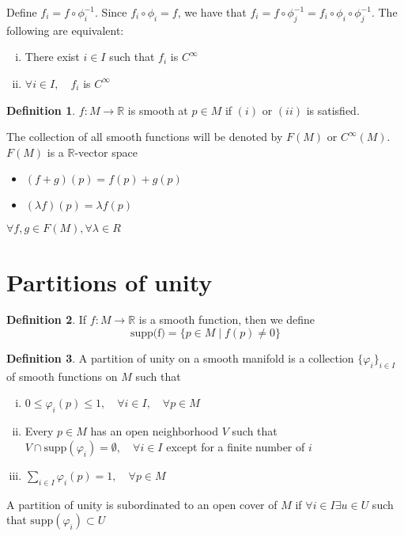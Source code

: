 \documentclass[]{book}
\theoremstyle{definition}
\newtheorem{defin}{Definition}[section]
\theoremstyle{definition}
\theoremstyle{definition}
\theoremstyle{definition}
\theoremstyle{definition}
\theoremstyle{definition}
\theoremstyle{definition}
\theoremstyle{definition}
\theoremstyle{definition}
\theoremstyle{definition}
\theoremstyle{definition}
\newcommand{\R}{\mathbb{R}}
\begin{document}
   Define $f_{i}=f\circ \phi_{i}^{-1}$. Since $f_{i}\circ \phi_{i}=f$, we have that $f_i= f\circ
   \phi_{j}^{-1}=f_{i}\circ \phi_{i}\circ \phi_{j}^{-1}$.
   The following are equivalent:
   \begin{enumerate}[i)]
     \item There exist  $i\in I$ such that $f_{i}$ is $C^{\infty}$ 
     \item $\forall  i\in I,\quad f_{i}$ is $C^{\infty}$
   \end{enumerate}

   \begin{defin}
     $f:M\longrightarrow \R$ is smooth at $p\in M$ if $(i)$ or $(ii)$ is satisfied.

     The collection of all smooth functions will be denoted by $F(M)$ or $C^{\infty}(M)$. $F(M)$ is
     a $\R$-vector space
     \begin{itemize}
       \item $(f+g)(p)=f(p)+g(p)$ 
       \item $(\lambda f)(p) =\lambda f(p)$
     \end{itemize}
     $\forall f,g\in F(M), \forall \lambda \in R$
   \end{defin}
   \section{Partitions of unity}

  \begin{defin}
   If $f:M\longrightarrow \R $ is a smooth function, then we define 
   \[
     \text{supp(f)}=\lbrace p\in M \mid f(p)\neq 0 \rbrace 
   \]     
  \end{defin}

  \begin{defin}
    A partition of unity on a smooth manifold is a collection $\lbrace \varphi_i \rbrace _{i\in I}$
    of smooth functions on $M$ such that
 
  \begin{enumerate}[i)]
    \item $0 \leq  \varphi_{i}(p)\leq 1,\quad \forall  i\in I ,\quad \forall p\in M$
    \item Every $p\in M$ has an open neighborhood $V$ such that $V \cap
      \text{supp}(\varphi_{i})=\emptyset,\quad \forall  i\in I$ except for a finite number of $i$
    \item $\sum_{i\in I}^{} \varphi_{i}(p)=1,\quad \forall  p\in M $
  \end{enumerate}
  A partition of unity is subordinated to an open cover of $M$ if $\forall  i\in I \exists u\in U$
  such that $\text{supp}(\varphi_{i})\subset U$
  \end{defin}
\end{document}
